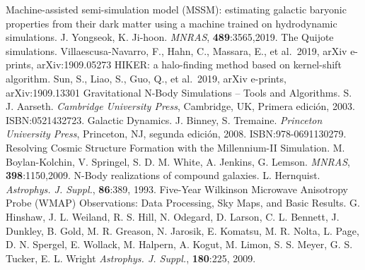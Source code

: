 \documentclass[12pt,spanish]{article}
\begin{document}
\begin{thebibliography}{00}
 Machine-assisted semi-simulation model (MSSM):
  estimating galactic baryonic properties from their dark matter using
  a machine trained on hydrodynamic simulations. J. Yongseok,
  K. Ji-hoon. {\it MNRAS}, {\bf 489}:3565,2019.
 The Quijote simulations. Villaescusa-Navarro, F.,
  Hahn, C., Massara, E., et al.\ 2019, arXiv e-prints,
  arXiv:1909.05273
 HIKER: a halo-finding method based on kernel-shift
  algorithm. Sun, S., Liao, S., Guo, Q., et al.\ 2019, arXiv e-prints,
  arXiv:1909.13301 
 Gravitational N-Body Simulations \--- Tools and
  Algorithms. S. J. Aarseth. {\it Cambridge University Press},
  Cambridge, UK, Primera edición, 2003. ISBN:0521432723.
 Galactic Dynamics. J. Binney, S. Tremaine. {\it Princeton 
University Press}, Princeton, NJ, segunda edición,
  2008. ISBN:978-0691130279.
 Resolving Cosmic Structure Formation with the
  Millennium-II Simulation. M. Boylan-Kolchin, V. Springel,
  S. D. M. White, A. Jenkins, G. Lemson. {\it MNRAS}, {\bf
    398}:1150,2009. 
 N-Body realizations of compound galaxies. L. Hernquist. 
  {\it Astrophys. J. Suppl.}, {\bf 86}:389, 1993.
 Five-Year Wilkinson Microwave Anisotropy Probe (WMAP)
  Observations: Data Processing, Sky Maps, and Basic
  Results. G. Hinshaw, J. L. Weiland, R. S. Hill, N. Odegard,
  D. Larson, C. L. Bennett, J. Dunkley, B. Gold, M. R. Greason,
  N. Jarosik, E. Komatsu, M. R. Nolta, L. Page, D. N. Spergel,
  E. Wollack, M. Halpern, A. Kogut, M. Limon, S. S. Meyer,
  G. S. Tucker, E. L. Wright {\it Astrophys. J. Suppl.}, {\bf
    180}:225, 2009.

\end{thebibliography}
\end{document}
